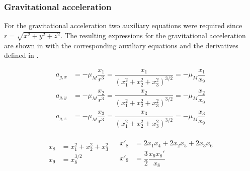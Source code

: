 

\subsubsection{Gravitational acceleration}
 \label{subsubsec:tsiGravity} 
 For the gravitational acceleration two auxiliary equations were required since $r=\sqrt{x^{2}+y^{2}+z^{2}}$. The resulting expressions for the gravitational acceleration are shown in  with the corresponding auxiliary equations and the derivatives defined in .
 
 \begin{equation} \label{eq:gravAcc}
\begin{split}
a_{g,x} &= -\mu_{M}\dfrac{x_{1}}{r^{3}} = \dfrac{x_{1}}{\left(x_{1}^{2}+x_{2}^{2}+x_{3}^{2} \right)^{3/2}}=-\mu_{M}\dfrac{x_{1}}{x_{9}}\\
a_{g,y} &= -\mu_{M}\dfrac{x_{2}}{r^{3}} = \dfrac{x_{2}}{\left(x_{1}^{2}+x_{2}^{2}+x_{3}^{2} \right)^{3/2}}=-\mu_{M}\dfrac{x_{2}}{x_{9}}\\
a_{g,z} &= -\mu_{M}\dfrac{x_{3}}{r^{3}} = \dfrac{x_{3}}{\left(x_{1}^{2}+x_{2}^{2}+x_{3}^{2} \right)^{3/2}}=-\mu_{M}\dfrac{x_{3}}{x_{9}}
\end{split}
\end{equation}

\begin{align} \label{eq:gravAux}
\begin{split} 
x_{8}&=x_{1}^{2}+x_{2}^{2}+x_{3}^{2}\\
x_{9}&=x_{8}^{3/2}
\end{split} 
&
\begin{split}
x'_{8}&=2x_{1}x_{4}+2x_{2}x_{5}+2x_{3}x_{6}\\
x'_{9}&=\dfrac{3}{2}\dfrac{x_{9}x_{8}'}{x_{8}}
\end{split}
\end{align}
 
 
 
